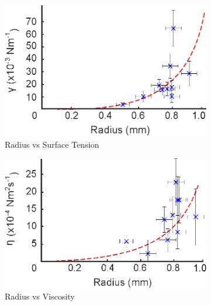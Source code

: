 \documentclass{physics_article_B}
\begin{document}
        \begin{figure}[H]
            \centering   
            \begin{subfigure}[b]{0.48\textwidth}
                \hspace*{-0.2cm}\includegraphics[width=\textwidth]{Figures/r_vs_gamma.eps}
                \caption{Radius vs Surface Tension}
                \label{fig:vsgamma:r}
            \end{subfigure}\hspace{3pt}
            \begin{subfigure}[b]{0.48\textwidth}
                \hspace*{0.2cm}\includegraphics[width=\textwidth]{Figures/r_vs_eta.eps} 
                \caption{Radius vs Viscosity}
                \label{fig:vseta:r}
                \end{subfigure}
                ~
            \begin{subfigure}[b]{0.48\textwidth}

\end{subfigure}
\end{figure}
\end{document}
